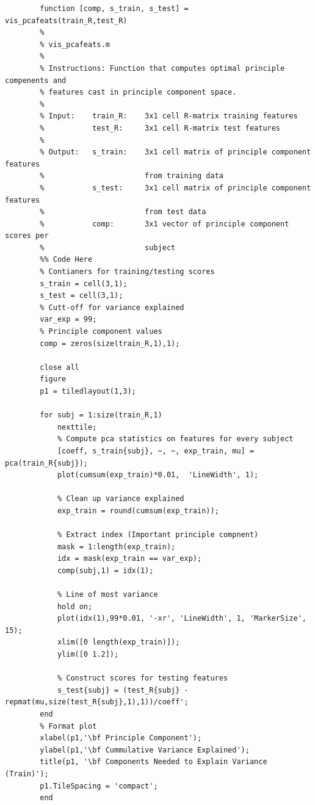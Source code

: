 \documentclass{article}
\begin{document}
	\begin{lstlisting}
		function [comp, s_train, s_test] = vis_pcafeats(train_R,test_R)
	    %
	    % vis_pcafeats.m
	    %
	    % Instructions: Function that computes optimal principle compenents and
	    % features cast in principle component space.
	    %
	    % Input:    train_R:    3x1 cell R-matrix training features
	    %           test_R:     3x1 cell R-matrix test features
	    %
	    % Output:   s_train:    3x1 cell matrix of principle component features
	    %                       from training data
	    %           s_test:     3x1 cell matrix of principle component features
	    %                       from test data
	    %           comp:       3x1 vector of principle component scores per
	    %                       subject
		%% Code Here
		% Contianers for training/testing scores
		s_train = cell(3,1);
		s_test = cell(3,1);
		% Cutt-off for variance explained
		var_exp = 99;
		% Principle component values
		comp = zeros(size(train_R,1),1);

		close all
		figure
		p1 = tiledlayout(1,3);

		for subj = 1:size(train_R,1)
		    nexttile;
		    % Compute pca statistics on features for every subject
		    [coeff, s_train{subj}, ~, ~, exp_train, mu] = pca(train_R{subj});
		    plot(cumsum(exp_train)*0.01,  'LineWidth', 1); 
		    
		    % Clean up variance explained
		    exp_train = round(cumsum(exp_train));
		    
		    % Extract index (Important principle compnent) 
		    mask = 1:length(exp_train);
		    idx = mask(exp_train == var_exp);
		    comp(subj,1) = idx(1);
		    
		    % Line of most variance
		    hold on;
		    plot(idx(1),99*0.01, '-xr', 'LineWidth', 1, 'MarkerSize', 15);
		    xlim([0 length(exp_train)]);
		    ylim([0 1.2]);
		    
		    % Construct scores for testing features
		    s_test{subj} = (test_R{subj} - repmat(mu,size(test_R{subj},1),1))/coeff';
		end
		% Format plot
		xlabel(p1,'\bf Principle Component');
		ylabel(p1,'\bf Cummulative Variance Explained');
		title(p1, '\bf Components Needed to Explain Variance (Train)');
		p1.TileSpacing = 'compact';
		end
	\end{lstlisting}
\end{document}
